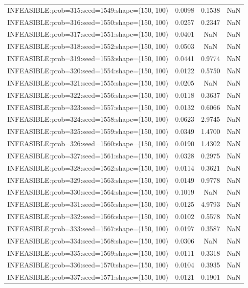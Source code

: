 \begin{longtable}{lccc}
INFEASIBLE:prob=315:seed=1549:shape=(150, 100) & 0.0098 &  0.1538 &    NaN \\
INFEASIBLE:prob=316:seed=1550:shape=(150, 100) & 0.0257 &  0.2347 &    NaN \\
INFEASIBLE:prob=317:seed=1551:shape=(150, 100) & 0.0401 &     NaN &    NaN \\
INFEASIBLE:prob=318:seed=1552:shape=(150, 100) & 0.0503 &     NaN &    NaN \\
INFEASIBLE:prob=319:seed=1553:shape=(150, 100) & 0.0441 &  0.9774 &    NaN \\
INFEASIBLE:prob=320:seed=1554:shape=(150, 100) & 0.0122 &  0.5750 &    NaN \\
INFEASIBLE:prob=321:seed=1555:shape=(150, 100) & 0.0205 &     NaN &    NaN \\
INFEASIBLE:prob=322:seed=1556:shape=(150, 100) & 0.0118 &  0.3637 &    NaN \\
INFEASIBLE:prob=323:seed=1557:shape=(150, 100) & 0.0132 &  0.6066 &    NaN \\
INFEASIBLE:prob=324:seed=1558:shape=(150, 100) & 0.0623 &  2.9745 &    NaN \\
INFEASIBLE:prob=325:seed=1559:shape=(150, 100) & 0.0349 &  1.4700 &    NaN \\
INFEASIBLE:prob=326:seed=1560:shape=(150, 100) & 0.0190 &  1.4302 &    NaN \\
INFEASIBLE:prob=327:seed=1561:shape=(150, 100) & 0.0328 &  0.2975 &    NaN \\
INFEASIBLE:prob=328:seed=1562:shape=(150, 100) & 0.0114 &  0.3621 &    NaN \\
INFEASIBLE:prob=329:seed=1563:shape=(150, 100) & 0.0149 &  0.9778 &    NaN \\
INFEASIBLE:prob=330:seed=1564:shape=(150, 100) & 0.1019 &     NaN &    NaN \\
INFEASIBLE:prob=331:seed=1565:shape=(150, 100) & 0.0125 &  4.9793 &    NaN \\
INFEASIBLE:prob=332:seed=1566:shape=(150, 100) & 0.0102 &  0.5578 &    NaN \\
INFEASIBLE:prob=333:seed=1567:shape=(150, 100) & 0.0197 &  0.3587 &    NaN \\
INFEASIBLE:prob=334:seed=1568:shape=(150, 100) & 0.0306 &     NaN &    NaN \\
INFEASIBLE:prob=335:seed=1569:shape=(150, 100) & 0.0111 &  0.3318 &    NaN \\
INFEASIBLE:prob=336:seed=1570:shape=(150, 100) & 0.0104 &  0.3935 &    NaN \\
INFEASIBLE:prob=337:seed=1571:shape=(150, 100) & 0.0121 &  0.1901 &    NaN \\

\end{longtable}
